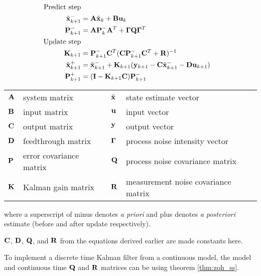 \begin{theorem}
  \label{thm:kalman_filter}

  \begin{align}
    \text{Predict step} \nonumber \\
    \hat{\mathbf{x}}_{k+1}^- &= \mathbf{A}\hat{\mathbf{x}}_k + \mathbf{B} \mathbf{u}_k \\
    \mathbf{P}_{k+1}^- &= \mathbf{A} \mathbf{P}_k^- \mathbf{A}^T +
      \mathbf{\Gamma}\mathbf{Q}\mathbf{\Gamma}^T \\
    \text{Update step} \nonumber \\
    \mathbf{K}_{k+1} &=
      \mathbf{P}_{k+1}^- \mathbf{C}^T (\mathbf{C}\mathbf{P}_{k+1}^- \mathbf{C}^T +
      \mathbf{R})^{-1} \\
    \hat{\mathbf{x}}_{k+1}^+ &=
      \hat{\mathbf{x}}_{k+1}^- + \mathbf{K}_{k+1}(\mathbf{y}_{k+1} -
      \mathbf{C} \hat{\mathbf{x}}_{k+1}^- - \mathbf{D}\mathbf{u}_{k+1}) \\
    \mathbf{P}_{k+1}^+ &= (\mathbf{I} - \mathbf{K}_{k+1}\mathbf{C})\mathbf{P}_{k+1}^-
  \end{align}

  \begin{figurekey}
    \begin{tabular}{llll}
      $\mathbf{A}$ & system matrix & $\hat{\mathbf{x}}$ & state estimate vector \\
      $\mathbf{B}$ & input matrix       & $\mathbf{u}$ & input vector \\
      $\mathbf{C}$ & output matrix      & $\mathbf{y}$ & output vector \\
      $\mathbf{D}$ & feedthrough matrix & $\mathbf{\Gamma}$ & process noise intensity
        vector \\
      $\mathbf{P}$ & error covariance matrix & $\mathbf{Q}$ & process noise covariance
        matrix \\
      $\mathbf{K}$ & Kalman gain matrix & $\mathbf{R}$ & measurement noise covariance
        matrix
    \end{tabular}
  \end{figurekey}

  where a superscript of minus denotes \textit{a priori} and plus denotes
  \textit{a posteriori} estimate (before and after update respectively).
\end{theorem}

$\mathbf{C}$, $\mathbf{D}$, $\mathbf{Q}$, and $\mathbf{R}$ from the equations derived
earlier are made constants here.

\begin{remark}
  To implement a discrete time Kalman filter from a continuous model, the model
  and continuous time $\mathbf{Q}$ and $\mathbf{R}$ matrices can be
   using theorem \ref{thm:zoh_ss}.
\end{remark}

